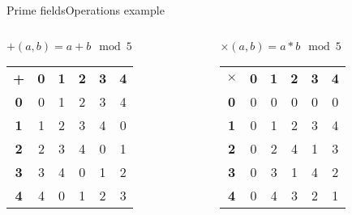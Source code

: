 \begin{frame}[t]{Prime fields}{Operations example}
	\begin{columns}
		\begin{column}{0.5\textwidth}
			\centering $+(a, b) = a + b \mod 5$				
			\begin{table}[]
				\begin{tabular}{cccccc}
					\textbf{+} & \textbf{0} & \textbf{1} & \textbf{2} & \textbf{3} & \textbf{4} \\
					\textbf{0} & 0          & 1          & 2          & 3          & 4          \\
					\textbf{1} & 1          & 2          & 3          & 4          & 0          \\
					\textbf{2} & 2          & 3          & 4          & 0          & 1          \\
					\textbf{3} & 3          & 4          & 0          & 1          & 2          \\
					\textbf{4} & 4          & 0          & 1          & 2          & 3         
				\end{tabular}
			\end{table}
		\end{column}
		\begin{column}{0.5\textwidth}  %
			\centering $\times(a, b) = a * b \mod 5$		
			\begin{table}[]
				\begin{tabular}{cccccc}
					\textbf{$\times$} & \textbf{0} & \textbf{1} & \textbf{2} & \textbf{3} & \textbf{4} \\
					\textbf{0} & 0          & 0          & 0          & 0          & 0          \\
					\textbf{1} & 0          & 1          & 2          & 3          & 4          \\
					\textbf{2} & 0          & 2          & 4          & 1          & 3          \\
					\textbf{3} & 0          & 3          & 1          & 4          & 2          \\
					\textbf{4} & 0          & 4          & 3          & 2          & 1         
				\end{tabular}
			\end{table}
		\end{column}
	\end{columns}
\end{frame}

